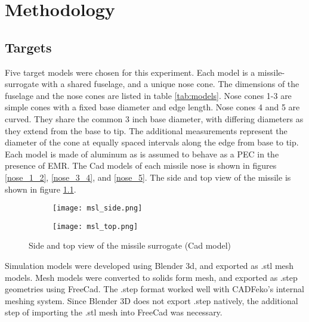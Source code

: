 \chapter{Methodology}
\label{ch:methodology}
\glsresetall


\section{Targets}

  Five target models were chosen for this experiment. Each model is a missile-surrogate with a shared fuselage, and a unique nose cone. The dimensions of the fuselage and the nose cones are listed in table \ref{tab:models}. Nose cones 1-3 are simple cones with a fixed base diameter and edge length. Nose cones 4 and 5 are curved. They share the common 3 inch base diameter, with  differing diameters as they extend from the base to tip. The additional measurements represent the diameter of the cone at equally spaced intervals along the edge from base to tip. Each model is made of aluminum as is assumed to behave as a PEC in the presence of EMR. The Cad models of each missile nose is shown in figures \ref{nose_1_2}, \ref{nose_3_4}, and \ref{nose_5}. The side and top view of the missile is shown in figure \ref{fig:missile_body}.

  \begin{figure}[htbp]
    \centering
    \begin{subfigure}{.5\textwidth}
      \centering
      \texttt{[image: msl\_side.png]}
    \end{subfigure}%
    \begin{subfigure}{.5\textwidth}
      \centering
      \texttt{[image: msl\_top.png]}
    \end{subfigure}
    \caption{Side and top view of the missile surrogate (Cad model)}
    \label{fig:missile_body}
  \end{figure}

  Simulation models were developed using Blender 3d, and exported as .stl mesh models. Mesh models were converted to solids form mesh, and exported as .step geometries using FreeCad. The .step format worked well with CADFeko's internal meshing system. Since Blender 3D does not export .step natively, the additional step of importing the .stl mesh into FreeCad was necessary.

